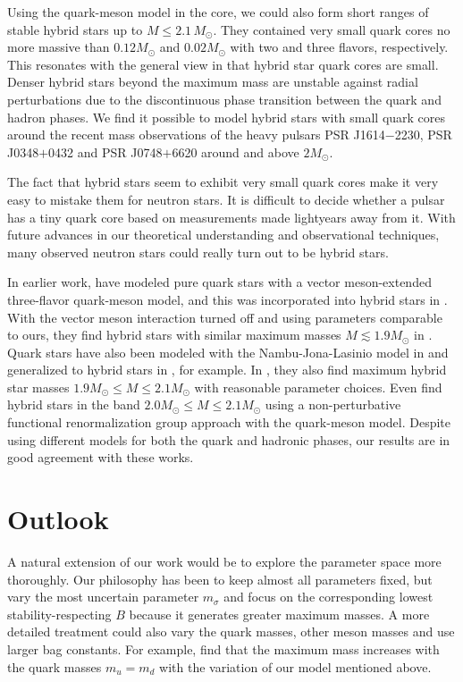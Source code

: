 Using the quark-meson model in the core, we could also form short ranges of stable hybrid stars up to $M \leq 2.1 \, M_\odot$.
They contained very small quark cores no more massive than $0.12 M_\odot$ and $0.02 M_\odot$ with two and three flavors, respectively.
This resonates with the general view in \cite{ref:quark_star_review} that hybrid star quark cores are small.
Denser hybrid stars beyond the maximum mass are unstable against radial perturbations due to the discontinuous phase transition between the quark and hadron phases.
We find it possible to model hybrid stars with small quark cores around the recent mass observations of the heavy pulsars PSR J1614$-$2230, PSR J0348$+$0432 and PSR J0748$+$6620 around and above $2 M_\odot$.

The fact that hybrid stars seem to exhibit very small quark cores
make it very easy to mistake them for neutron stars.
It is difficult to decide whether a pulsar has a tiny quark core based on measurements made lightyears away from it.
With future advances in our theoretical understanding and observational techniques,
many observed neutron stars could really turn out to be hybrid stars.

In earlier work, \cite{ref:lsm3f_compact_stars} have modeled pure quark stars with a vector meson-extended three-flavor quark-meson model,
and this was incorporated into hybrid stars in \cite{ref:lsm3f_hybrid_stars}.
With the vector meson interaction turned off and using parameters comparable to ours,
they find hybrid stars with similar maximum masses $M \lesssim 1.9 M_\odot$ in \cite[figure 8]{ref:lsm3f_hybrid_stars}. %
Quark stars have also been modeled with the Nambu-Jona-Lasinio model in \cite{ref:quark_star_njl} and generalized to hybrid stars in \cite{ref:hybrid_stars_njl}, for example.
In \cite[figure 3]{ref:hybrid_stars_njl}, they also find maximum hybrid star masses $1.9 M_\odot \leq M \leq 2.1 M_\odot$ with reasonable parameter choices.
Even \cite{ref:quark_hybrid_additional_ref} find hybrid stars in the band $2.0 M_\odot \leq M \leq 2.1 M_\odot$
using a non-perturbative functional renormalization group approach with the quark-meson model.
Despite using different models for both the quark and hadronic phases,
our results are in good agreement with these works.

\section{Outlook}

A natural extension of our work would be to
explore the parameter space more thoroughly.
Our philosophy has been to keep almost all parameters fixed,
but vary the most uncertain parameter $m_\sigma$ and focus on the corresponding lowest stability-respecting $B$
because it generates greater maximum masses.
A more detailed treatment could also vary the quark masses,
other meson masses and use larger bag constants.
For example, \cite{ref:lsm3f_compact_stars}
find that the maximum mass increases with the quark masses $m_u=m_d$
with the variation of our model mentioned above.

